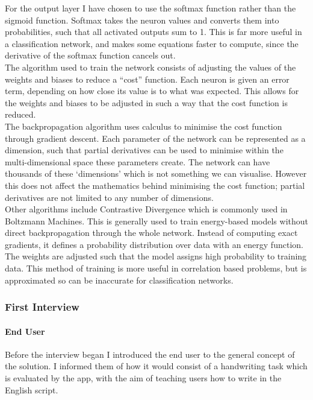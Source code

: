 \documentclass{article}
\begin{document}
For the output layer I have chosen to use the softmax function rather than the sigmoid function. Softmax takes the neuron values and converts them into probabilities, such that all activated outputs sum to 1. This is far more useful in a classification network, and makes some equations faster to compute, since the derivative of the softmax function cancels out. \\

The algorithm used to train the network consists of adjusting the values of the weights and biases to reduce a “cost” function. Each neuron is given an error term, depending on how close its value is to what was expected. This allows for the weights and biases to be adjusted in such a way that the cost function is reduced. \\

The backpropagation algorithm uses calculus to minimise the cost function through gradient descent. Each parameter of the network can be represented as a dimension, such that partial derivatives can be used to minimise within the multi-dimensional space these parameters create. The network can have thousands of these `dimensions' which is not something we can visualise. However this does not affect the mathematics behind minimising the cost function; partial derivatives are not limited to any number of dimensions. \\

Other algorithms include Contrastive Divergence which is commonly used in Boltzmann Machines. This is generally used to train energy-based models without direct backpropagation through the whole network. Instead of computing exact gradients, it defines a probability distribution over data with an energy function. The weights are adjusted such that the model assigns high probability to training data. This method of training is more useful in correlation based problems, but is approximated so can be inaccurate for classification networks.

\subsubsection{First Interview}
\paragraph{End User\\}

Before the interview began I introduced the end user to the general concept of the solution. I informed them of how it would consist of a handwriting task which is evaluated by the app, with the aim of teaching users how to write in the English script.
\end{document}
